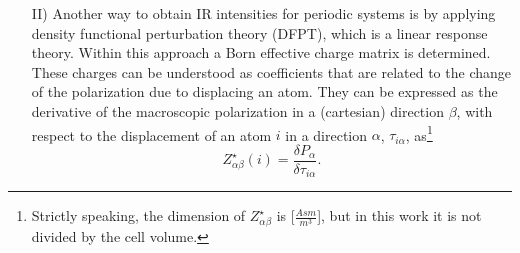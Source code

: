 \documentclass[11pt,DIV=13,BCOR=5mm,a4paper,headinclude]{scrbook}
\renewcommand{\vec}[1]{\underline{#1}}
\begin{document}
\begin{itemize}




\item[II)] Another way to obtain IR intensities for periodic systems is by applying density functional perturbation theory (DFPT)\cite{Baroni1987,Giannozzi1991}, which is a linear response theory.
Within this approach a Born effective charge matrix is determined\cite{Born1954}.
These charges can be understood as coefficients that are related to the change of the polarization due to displacing an atom.
They can be expressed as the derivative of the macroscopic polarization in a (cartesian) direction $\beta$, with respect to the displacement of an atom $i$ in a direction $\alpha$, $\tau_{i\alpha}$, as\footnote{Strictly speaking, the dimension of $Z^\star_{\alpha\beta}$ is [$\frac{Asm}{m^3}$], but in this work it is not divided by the cell volume.}
\begin{equation}
Z^\star_{\alpha\beta}(i)=\frac{\delta P_\alpha}{\delta \tau_{i\alpha}}.
\end{equation}


\end{itemize}
\end{document}
